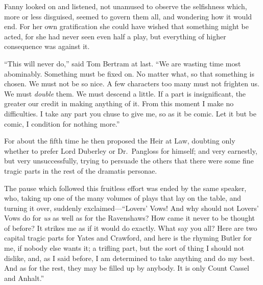 Fanny looked on and listened, not unamused to observe
the selfishness which, more or less disguised, seemed to
govern them all, and wondering how it would end.  For her
own gratification she could have wished that something
might be acted, for she had never seen even half a play,
but everything of higher consequence was against it.

``This will never do,'' said Tom Bertram at last.  ``We are
wasting time most abominably.  Something must be fixed on.
No matter what, so that something is chosen.  We must not be
so nice.  A few characters too many must not frighten us.
We must \emph{double} them.  We must descend a little.
If a part is insignificant, the greater our credit in making
anything of it.  From this moment I make no difficulties.
I take any part you chuse to give me, so as it be comic.
Let it but be comic, I condition for nothing more.''

For about the fifth time he then proposed the Heir at Law,
doubting only whether to prefer Lord Duberley or Dr.\ Pangloss
for himself; and very earnestly, but very unsuccessfully,
trying to persuade the others that there were some fine
tragic parts in the rest of the dramatis personae.

The pause which followed this fruitless effort
was ended by the same speaker, who, taking up one
of the many volumes of plays that lay on the table,
and turning it over, suddenly exclaimed---``Lovers' Vows!
And why should not Lovers' Vows do for \emph{us} as well
as for the Ravenshaws?  How came it never to be thought
of before?  It strikes me as if it would do exactly.
What say you all?  Here are two capital tragic parts for
Yates and Crawford, and here is the rhyming Butler for me,
if nobody else wants it; a trifling part, but the sort
of thing I should not dislike, and, as I said before,
I am determined to take anything and do my best.
And as for the rest, they may be filled up by anybody.
It is only Count Cassel and Anhalt.''

